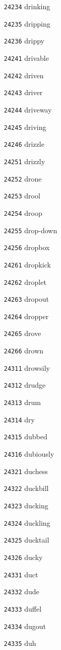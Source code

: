 \documentclass[twoside,11pt]{article}
\begin{document}
\begin{multicols}{5}
\begin{enumerate}
\item[\texttt{24234}] drinking
\item[\texttt{24235}] dripping
\item[\texttt{24236}] drippy
\item[\texttt{24241}] drivable
\item[\texttt{24242}] driven
\item[\texttt{24243}] driver
\item[\texttt{24244}] driveway
\item[\texttt{24245}] driving
\item[\texttt{24246}] drizzle
\item[\texttt{24251}] drizzly
\item[\texttt{24252}] drone
\item[\texttt{24253}] drool
\item[\texttt{24254}] droop
\item[\texttt{24255}] drop-down
\item[\texttt{24256}] dropbox
\item[\texttt{24261}] dropkick
\item[\texttt{24262}] droplet
\item[\texttt{24263}] dropout
\item[\texttt{24264}] dropper
\item[\texttt{24265}] drove
\item[\texttt{24266}] drown
\item[\texttt{24311}] drowsily
\item[\texttt{24312}] drudge
\item[\texttt{24313}] drum
\item[\texttt{24314}] dry
\item[\texttt{24315}] dubbed
\item[\texttt{24316}] dubiously
\item[\texttt{24321}] duchess
\item[\texttt{24322}] duckbill
\item[\texttt{24323}] ducking
\item[\texttt{24324}] duckling
\item[\texttt{24325}] ducktail
\item[\texttt{24326}] ducky
\item[\texttt{24331}] duct
\item[\texttt{24332}] dude
\item[\texttt{24333}] duffel
\item[\texttt{24334}] dugout
\item[\texttt{24335}] duh

\end{enumerate}
\end{multicols}
\end{document}
